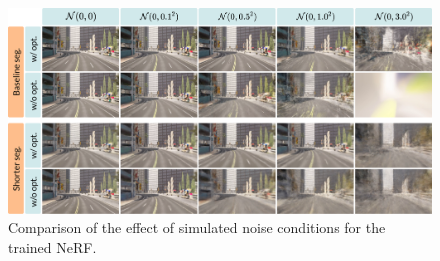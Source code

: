 \begin{figure}[!h]
    \centering
    \includegraphics[width=1.0\textwidth]{figures/noise-combined-comparison.png}
    \caption[Qualitative assessment of NeRF trained on noisy dataset.]{Comparison of the effect of simulated noise conditions for the trained NeRF.}
    \label{fig:noise-combined-comparison}
\end{figure}
